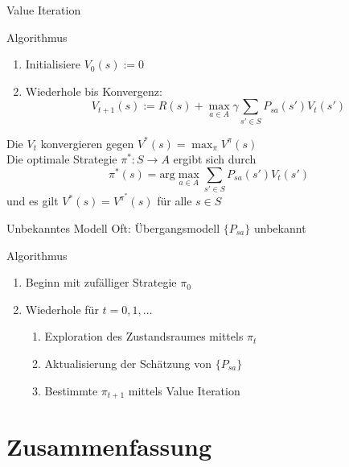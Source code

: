 \documentclass[xcolor={dvipsnames,svgnames}]{beamer}
\begin{document}
\begin{frame}{Value Iteration}
  \begin{block}{Algorithmus}
    \begin{enumerate}
    \item Initialisiere $V_0(s) := 0$
    \item Wiederhole bis Konvergenz:
      \[
        V_{t+1}(s) := R(s) + \max_{a\in A} \gamma \sum_{s' \in S} P_{sa}(s') V_t(s')
      \]
    \end{enumerate}
  \end{block}
  Die $V_t$ konvergieren gegen $V^{*}(s) = \max_{\pi} V^\pi(s)$ \\
  Die optimale Strategie $\pi^* : S \to A$ ergibt sich durch
  \[
    \pi^*(s) = \text{arg}\max_{a\in A} \sum_{s'\in S}P_{sa}(s') V_t(s')
  \]
  und es gilt $V^*(s) = V^{\pi^*}(s)$ für alle $s \in S$
\end{frame}

\begin{frame}{Unbekanntes Modell}
  Oft: Übergangsmodell $\{P_{sa}\}$ unbekannt

  \begin{block}{Algorithmus}
    \begin{enumerate}
    \item Beginn mit zufälliger Strategie $\pi_0$
    \item Wiederhole für $t=0,1,\ldots$
      \begin{enumerate}
      \item Exploration des Zustandsraumes mittels $\pi_t$
      \item Aktualisierung der Schätzung von $\{P_{sa}\}$
      \item Bestimmte $\pi_{t+1}$ mittels Value Iteration
      \end{enumerate}
    \end{enumerate}
  \end{block}
\end{frame}

\section{Zusammenfassung}
\end{document}
